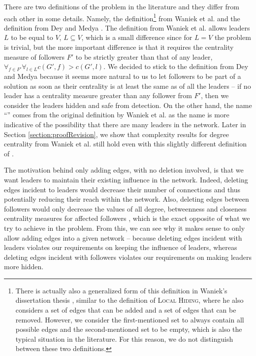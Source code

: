 There are two definitions of the \HL problem in the literature and they differ from each other in some details.
Namely, the definition\footnote{
    There is actually also a generalized form of this definition in Waniek's dissertation thesis \cite{WaniekPhD2017},
    similar to the definition of \textsc{Local Hiding},
    where he also considers a set of edges that can be added and a set of edges that can be removed.
    However, we consider the first-mentioned set to always contain all possible edges and the second-mentioned set
    to be empty, which is also the typical situation in the literature.
    For this reason, we do not distinguish between these two definitions.
}
from Waniek et al. \cite{Waniek2017} and the definition from Dey and Medya \cite{Dey2019}.
The definition from Waniek et al. \cite{Waniek2017} allows leaders $L$ to be equal to $V$, $L \subseteq V$,
which is a small difference since for $L = V$ the problem is trivial, but the more important difference is that
it requires the centrality measure of followers $F'$ to be strictly greater than that of any leader,
$\forall_{f \in F'} \forall_{l \in L} c(G', f) > c(G', l)$.
We decided to stick to the definition from Dey and Medya \cite{Dey2019} because it seems more natural to us to let followers
to be part of a solution as soon as their centrality is at least the same as of all the leaders --
if no leader has a centrality measure greater than any follower from $F'$, then
we consider the leaders hidden and safe from detection.
On the other hand, the name ``\HL'' comes from the original definition by Waniek et al. as
the name is more indicative of the possibility that there are many leaders in the network.
Later in Section \ref{section:proofRevision}, we show that complexity results for degree centrality
from Waniek et al. \cite{Waniek2017} still hold even with this slightly different definition of \HLshort.

The motivation behind only adding edges, with no deletion involved, is that we want leaders to maintain
their existing influence in the network.
Indeed, deleting edges incident to leaders would decrease their number of connections and thus potentially
reducing their reach within the network.
Also, deleting edges between followers would only decrease the values of all degree, betweenness and closeness
centrality measures for affected followers \cite{Waniek2016},
which is the exact opposite of what we try to achieve in the \HL problem.
From this, we can see why it makes sense to only allow adding edges into a given network --
because deleting edges incident with leaders violates our requirements on keeping the influence of leaders,
whereas deleting edges incident with followers violates our requirements on making leaders more hidden.

